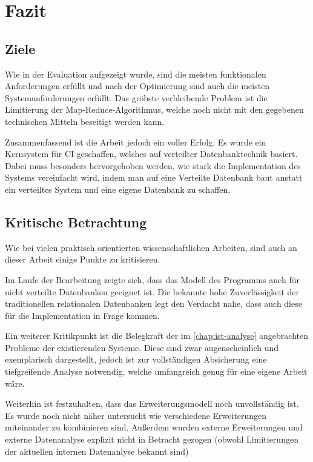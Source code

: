 \chapter{Fazit}
\label{cha:fazit}


\section{Ziele}
\label{sec:fazit:ziele}

Wie in der Evaluation aufgezeigt wurde, sind die meisten funktionalen Anforderungen erfüllt und nach der Optimierung sind auch die meisten Systemanforderungen erfüllt.
Das gröbste verbleibende Problem ist die Limitierung der Map-Reduce-Algorithmus,
welche noch nicht mit den gegebenen technischen Mitteln beseitigt werden kann.

Zusammenfassend ist die Arbeit jedoch ein voller Erfolg.
Es wurde ein Kernsystem für \ac{CI} geschaffen, welches auf verteilter Datenbanktechnik basiert.
Dabei muss besonders hervorgehoben werden, wie stark die Implementation des Systems vereinfacht wird, indem man auf eine Verteilte Datenbank baut anstatt ein verteiltes System und eine eigene Datenbank zu schaffen.


\section{Kritische Betrachtung}
\label{sec:fazit:kritik}

Wie bei vielen praktisch orientierten wissenschaftlichen Arbeiten,
sind auch an dieser Arbeit einige Punkte zu kritisieren.

Im Laufe der Bearbeitung zeigte sich, dass das Modell des Programms auch für
nicht verteilte Datenbanken geeignet ist.
Die bekannte hohe Zuverlässigkeit der traditionellen relationalen Datenbanken legt den Verdacht nahe, dass auch diese für die Implementation in Frage kommen.

Ein weiterer Kritikpunkt ist die Belegkraft der im \cref{chap:ist-analyse} angebrachten Probleme der existierenden Systeme. Diese sind zwar augenscheinlich und exemplarisch dargestellt, jedoch ist zur vollständigen Absicherung eine tiefgreifende Analyse notwendig, welche umfangreich genug für eine eigene Arbeit wäre.

Weiterhin ist festzuhalten, dass das Erweiterungsmodell noch unvollständig ist.
Es wurde noch nicht näher untersucht wie verschiedene Erweiterungen miteinander zu kombinieren sind. Außerdem wurden externe Erweiterungen und externe Datenanalyse explizit nicht in Betracht gezogen (obwohl Limitierungen der aktuellen internen Datenanlyse bekannt sind)

